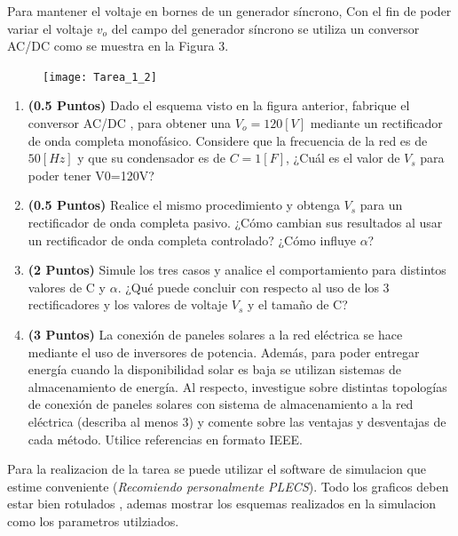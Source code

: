 \documentclass[
  11pt,
  letterpaper,
   addpoints,
   answers
  ]{exam}
\begin{document}
\begin{questions}
    \question Para mantener el voltaje en bornes de un generador síncrono, Con el fin de poder variar el voltaje $v_{o}$ del
    campo del generador síncrono se utiliza un conversor AC/DC como se muestra en la Figura 3.
    \begin{figure}[h!]
        \centering
        \texttt{[image: Tarea\_1\_2]}
    \end{figure}
    \begin{enumerate}[label=\alph*)]
        \item \textbf{(0.5 Puntos)} Dado el esquema visto en la figura anterior, fabrique el conversor AC/DC , para obtener una $V_{o}= 120[V]$ mediante un rectificador de onda completa monofásico. Considere que la frecuencia de la red es de $50[Hz]$ y que su condensador es de $C=1[F]$, ¿Cuál es el valor de $V_{s}$ para poder tener V0=120V?
        \item \textbf{(0.5 Puntos)} Realice el mismo procedimiento y obtenga $V_{s}$ para un rectificador de onda completa pasivo. ¿Cómo cambian sus resultados al usar un rectificador de onda completa controlado? ¿Cómo influye $\alpha$?
        \item \textbf{(2 Puntos)} Simule los tres casos y analice el comportamiento para distintos valores de C y $\alpha$. ¿Qué puede concluir con respecto al uso de los 3 rectificadores y los valores de voltaje $V_{s}$ y el tamaño de C?
        \item \textbf{(3 Puntos)} La conexión de paneles solares a la red eléctrica se hace mediante el uso de inversores de potencia. Además, para poder entregar energía cuando la disponibilidad solar es baja se utilizan sistemas de almacenamiento de energía.  Al respecto, investigue sobre distintas topologías de conexión de paneles solares con sistema de almacenamiento a la red eléctrica (describa al menos 3) y comente sobre las ventajas y desventajas de cada método. Utilice referencias en formato IEEE.
    \end{enumerate}
\end{questions}
Para la realizacion de la tarea se puede utilizar el software de simulacion que estime conveniente (\textit{Recomiendo personalmente PLECS}). Todo los graficos deben estar bien rotulados , ademas mostrar los esquemas realizados en la simulacion como los parametros utilziados.
\end{document}
